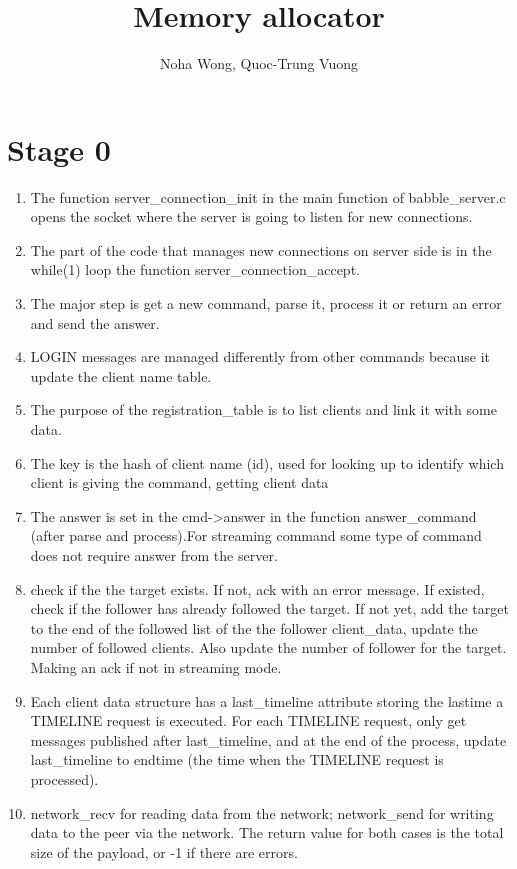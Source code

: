 \documentclass{article}
\title{Memory allocator}
\author{Noha Wong, Quoc-Trung Vuong}
\begin{document}
\maketitle
\section{Stage 0}
\begin{enumerate}
\item The function server\_connection\_init in the main function of babble\_server.c opens the socket where the server is going to listen for new connections.
\item The part of the code that manages new connections on server side is in the while(1) loop the function server\_connection\_accept.
\item The major step is get a new command, parse it, process it or return an error and send the answer.
\item LOGIN messages are managed differently from other commands because it update the client name table.
\item The purpose of the registration\_table is to list clients and link it with some data.
\item The key is the hash of client name (id), used for looking up to identify which client is giving the command, getting client data
\item The answer is set in the cmd->answer in the function answer\_command (after parse and process).For streaming command some type of command does not require answer from the server.
\item check if the the target exists. If not, ack with an error message. If existed, check if the follower has already followed the target. If not yet, add the target to the end of the followed list of the the follower client\_data, update the number of followed clients. Also update the number of follower for the target. Making an ack if not in streaming mode.
\item Each client data structure has a last\_timeline attribute storing the lastime a TIMELINE request is executed. For each TIMELINE request, only get messages published after last\_timeline, and at the end of the process, update last\_timeline to endtime (the time when the TIMELINE request is processed).
\item network\_recv for reading data from the network; network\_send for writing data to the peer via the network. The return value for both cases is the total size of the payload, or -1 if there are errors.

\end{enumerate}
\end{document}
